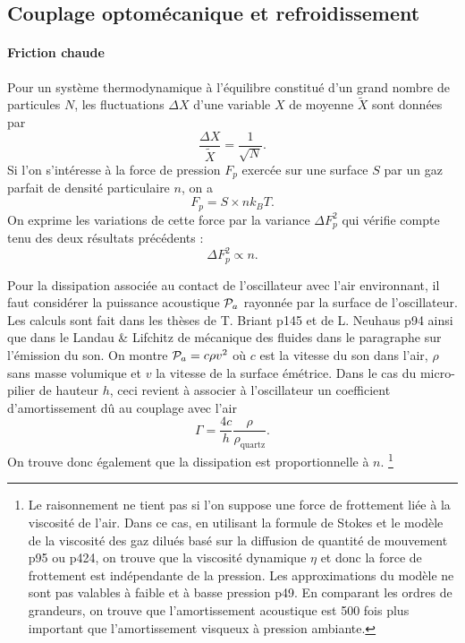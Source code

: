 \documentclass[12pt,a4paper]{article}
\begin{document}
\subsection{Couplage optomécanique et refroidissement}
\label{sec:optomechanics}

\paragraph{Friction \og chaude\fg{}\\}
Pour un système thermodynamique à l'équilibre constitué d'un grand nombre de particules $N$, les fluctuations $\Delta X$ d'une variable $X$ de moyenne $\tilde{X}$ sont données par
\begin{equation}
\frac{\Delta X}{\tilde{X}} = \frac{1}{\sqrt{N}}.
\end{equation}
Si l'on s'intéresse à la force de pression $F_p$ exercée sur une surface $S$ par un gaz parfait de densité particulaire $n$, on a
\begin{equation}
F_p = S \times n k_B T.
\end{equation}
On exprime les variations de cette force par la variance $\Delta F_p^2$ qui vérifie compte tenu des deux résultats précédents :
\begin{equation}
\Delta F_p^2 \propto n.
\end{equation}

Pour la dissipation associée au contact de l'oscillateur avec l'air environnant, il faut considérer la puissance acoustique ${\cal{P}}_a$ rayonnée par la surface de l'oscillateur.
Les calculs sont fait dans les thèses de T. Briant p145 et de L. Neuhaus p94 ainsi que dans le Landau \& Lifchitz de mécanique des fluides dans le paragraphe sur l'émission du son.
On montre ${\cal{P}}_a = c \rho v^2$ où $c$ est la vitesse du son dans l'air, $\rho$ sans masse volumique et $v$ la vitesse de la surface émétrice. Dans le cas du micro-pilier de hauteur $h$, ceci revient à associer à l'oscillateur un coefficient d'amortissement dû au couplage avec l'air
\begin{equation}
\Gamma = \frac{4c}{h} \frac{\rho}{\rho_\mathrm{quartz}}.
\end{equation}
On trouve donc également que la dissipation est proportionnelle à $n$.
\footnote{Le raisonnement ne tient pas si l'on suppose une force de frottement liée à la viscosité de l'air.
Dans ce cas, en utilisant la formule de Stokes et le modèle de la viscosité des gaz dilués basé sur la diffusion de quantité de mouvement \cite{Guyon2001} p95 ou \cite{Olivier2000} p424, on trouve que la viscosité dynamique $\eta$ et donc la force de frottement est indépendante de la pression.
Les approximations du modèle ne sont pas valables à faible et à basse pression \cite{Guyon2001} p49.
En comparant les ordres de grandeurs, on trouve que l'amortissement acoustique est 500 fois plus important que l'amortissement visqueux à pression ambiante.}
\end{document}
